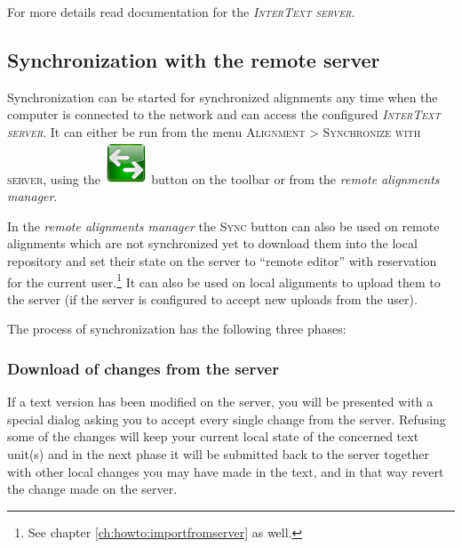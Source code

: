 \documentclass[a4paper,10pt,oneside]{book}
\newcommand{\ITserver}{\textit{\textsc{InterText server}}\xspace}
\newcommand{\menu}[1]{\textsc{#1}}
\begin{document}
For more details read documentation for the \ITserver.

\subsection{Synchronization with the remote server}\label{ch:detail:managing_remote:sync}

Synchronization can be started for synchronized alignments any time when the computer is connected to the network and can access the configured \ITserver. It can either be run from the menu \menu{Alignment} > \menu{Synchronize with server}, using the \includegraphics[height=2ex]{../images/48/synchronize.png} button on the toolbar or from the \emph{remote alignments manager}.

In the \emph{remote alignments manager} the \menu{Sync} button can also be used on remote alignments which are not synchronized yet to download them into the local repository and set their state on the server to ``remote editor'' with reservation for the current user.\footnote{See chapter \ref{ch:howto:importfromserver} as well.} It can also be used on local alignments to upload them to the server (if the server is configured to accept new uploads from the user).

The process of synchronization has the following three phases:

\subsubsection{Download of changes from the server}\label{ch:detail:managing_remote:sync:download}

If a text version has been modified on the server, you will be presented with a special dialog asking you to accept every single change from the server. Refusing some of the changes will keep your current local state of the concerned text unit(s) and in the next phase it will be submitted back to the server together with other local changes you may have made in the text, and in that way revert the change made on the server.
\end{document}
